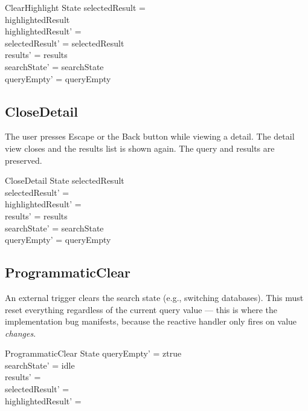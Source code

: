 \documentclass[a4paper,10pt,fleqn]{article}
\begin{document}
\begin{schema}{ClearHighlight}
  \Delta State
  \where
  selectedResult = \emptyset \\
  highlightedResult \neq \emptyset \\
  highlightedResult' = \emptyset \\
  selectedResult' = selectedResult \\
  results' = results \\
  searchState' = searchState \\
  queryEmpty' = queryEmpty
\end{schema}

\subsection{CloseDetail}

The user presses Escape or the Back button while viewing a detail. The
detail view closes and the results list is shown again. The query and
results are preserved.

\begin{schema}{CloseDetail}
  \Delta State
  \where
  selectedResult \neq \emptyset \\
  selectedResult' = \emptyset \\
  highlightedResult' = \emptyset \\
  results' = results \\
  searchState' = searchState \\
  queryEmpty' = queryEmpty
\end{schema}

\subsection{ProgrammaticClear}

An external trigger clears the search state (e.g., switching databases).
This must reset everything regardless of the current query value --- this
is where the implementation bug manifests, because the reactive handler
only fires on value \emph{changes}.

\begin{schema}{ProgrammaticClear}
  \Delta State
  \where
  queryEmpty' = ztrue \\
  searchState' = idle \\
  results' = \emptyset \\
  selectedResult' = \emptyset \\
  highlightedResult' = \emptyset
\end{schema}
\end{document}
